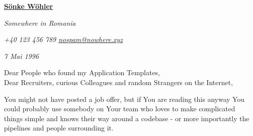 \documentclass[paper=a4,fontsize=11pt]{scrartcl} %
\newcommand{\sepspace}{\vspace*{1em}}    %
\newcommand{\MyName}[1]{ %
  \Huge \hfill \textbf{#1}\par 
  \hrulefill
  \normalsize \normalfont}
\newcommand{\MyAddress}[3]{ %
  \par \usefont{OT1}{phv}{m}{n}\hfill \textit{#1}
  \par \usefont{OT1}{phv}{m}{n}\hfill \textit{#2}
  \par \usefont{OT1}{phv}{m}{n}\hfill \textit{#3}
  \par \normalfont}
\begin{document}



  \newcommand{\StylisedName}{
    \MyName{
          \href{https://www.linkedin.com/in/sonke-wohler-54657a145/}
      { \textcolor{headerColor}{S\"onke W\"ohler} }
    }
  }

  \newcommand{\MyDate}{
    \footnotesize Cri`sana 21.01.2022 \normalsize \\
  }
  \newcommand{\SameAddress}{
    \MyAddress
      { \textcolor{titleColor}{ Somewhere in Romania }}
      { \textcolor{titleColor}{ +40 123 456 789 \hspace{5pt} \href{dummy@nowhere.xyz}{nospam@nowhere.xyz} }}
      { \textcolor{titleColor}{ 7 Mai 1996 }}
  }

  \newcommand{\CoverAddress}{
    \footnotesize \SameAddress
    \normalsize
  }


  \StylisedName
  \CoverAddress

  \sepspace %
  
  \noindent
  Dear People who found my Application Templates,  \\
  Dear Recruiters, curious Colleagues and random Strangers on the Internet,
  
  \sepspace 

  \noindent  You might not have posted a job offer, but if You are reading this
  anyway You could probably use somebody on Your team who loves to make
  complicated things simple and knows their way around a codebase - or more
  importantly the pipelines and people surrounding it.

  \sepspace
  
\end{document}
